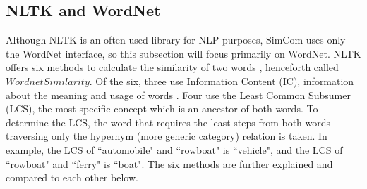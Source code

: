 \documentclass{article}
\begin{document}
\subsection{NLTK and WordNet}
Although NLTK is an often-used library for NLP purposes, SimCom uses only the WordNet interface, so this subsection will focus primarily on WordNet. 
NLTK offers six methods to calculate the similarity of two words \citep{pedersen2004wordnet}, henceforth called $\textit{WordnetSimilarity}$. Of the six, three use Information Content (IC), information about the meaning and usage of words \cite{seco2004intrinsic}. Four use the Least Common Subsumer (LCS), the most specific concept which is an ancestor of both words. To determine the LCS, the word that requires the least steps from both words traversing only the hypernym (more generic category) relation is taken. In example, the LCS of ``automobile" and ``rowboat" is ``vehicle", and the LCS of ``rowboat" and ``ferry" is ``boat". The six methods are further explained and compared to each other below.
\end{document}
